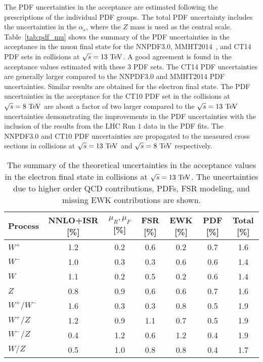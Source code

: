 The PDF uncertainties in the acceptance are estimated following the prescriptions of the individual PDF groups. The total PDF uncertainty includes the  uncertainties in the $\alpha_s$, where the $Z$ mass is used as the central scale.  Table~\ref{tab:pdf_mu} shows the summary of the PDF uncertainties in the acceptance in the muon final state for the NNPDF3.0, MMHT2014~\cite{Harland-Lang:2014zoa}, and CT14~\cite{Dulat:2015mca} PDF sets in collisions at $\sqrt{s}=13~\mathrm{Te\kern -0.1em V}$. A good agreement is found in the acceptance values estimated with these $3$ PDF sets. The CT14 PDF uncertainties are generally larger compared to the NNPDF3.0 and MMHT2014 PDF uncertainties. Similar results are obtained for the electron final state. The PDF uncertainties in the acceptance for the CT10 PDF set in the collisions at $\sqrt{s}=8~\mathrm{Te\kern -0.1em V}$ are about a factor of two larger compared to the $\sqrt{s}=13~\mathrm{Te\kern -0.1em V}$ uncertainties demonstrating the improvements in the PDF uncertainties with the inclusion of the results from the LHC Run $1$ data in the PDF fits. The NNPDF3.0 and CT10 PDF uncertainties are propagated to the measured cross sections in collisions at $\sqrt{s}=13~\mathrm{Te\kern -0.1em V}$ and $\sqrt{s}=8~\mathrm{Te\kern -0.1em V}$ respectively.     
\begin{table}[htbp]
\begin{center}
\begin{tabular}{|l|c|c|c|c|c|c|}
\hline
Process & NNLO+ISR [\%] & $\mu_{R}\mathrm{,}\mu_{F}$ [\%] & FSR [\%] & EWK [\%] & PDF [\%]& Total [\%] \\
\hline\hline
$W^+$        & 1.2 &  0.2 & 0.6  & 0.2 & 0.7 & 1.6 \\
$W^-$  & 1.0 &  0.3 & 0.3  & 0.6 & 0.6 & 1.4 \\
$W$            & 1.1 &  0.2 & 0.5  & 0.2 & 0.6 & 1.4 \\
$Z$              & 0.8 &  0.9 & 0.6  & 0.6 & 0.7 & 1.6 \\
$W^+/W^-$                      & 1.6 &  0.3 & 0.3  & 0.8 & 0.5 & 1.9 \\
$W^+/Z$                         & 1.2 &  0.9 & 1.1  & 0.7 & 0.5 & 1.9 \\
$W^-/Z$                         & 0.4 &  1.2 & 0.6  & 1.2 & 0.4 & 1.9 \\
$W/Z$                          & 0.5 &  1.0 & 0.8  & 0.8 & 0.4 & 1.7 \\
\hline\hline
\end{tabular}
\caption{The summary of the theoretical uncertainties in the acceptance values in the electron final state in collisions at $\sqrt{s}=13~\mathrm{Te\kern -0.1em V}$. The uncertainties due to higher order QCD contributions, PDFs, FSR modeling, and missing EWK contributions are shown.}
\label{tab_el}
\end{center}
\end{table}

